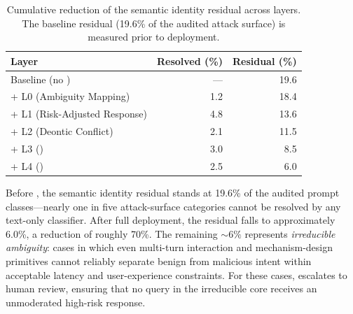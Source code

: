 \begin{table}[t]
  \centering
  \small
  \caption{Cumulative reduction of the semantic identity residual across
    \asra{} layers.  The baseline residual (19.6\% of the audited attack
    surface) is measured prior to \asra{} deployment.}
  \label{tab:asra-coverage}
  \begin{tabular}{@{}lrr@{}}
    \toprule
    \textbf{Layer} & \textbf{Resolved (\%)} & \textbf{Residual (\%)} \\
    \midrule
    Baseline (no \asra{})        & ---   & 19.6 \\
    + L0 (Ambiguity Mapping)     &  1.2  & 18.4 \\
    + L1 (Risk-Adjusted Response)&  4.8  & 13.6 \\
    + L2 (Deontic Conflict)      &  2.1  & 11.5 \\
    + L3 (\aas{})                &  3.0  &  8.5 \\
    + L4 (\irm{})                &  2.5  &  6.0 \\
    \bottomrule
  \end{tabular}
\end{table}

Before \asra{}, the semantic identity residual stands at 19.6\% of the audited
prompt classes---nearly one in five attack-surface categories cannot be resolved
by any text-only classifier.  After full \asra{} deployment, the residual
falls to approximately 6.0\%, a reduction of roughly 70\%.  The remaining
${\sim}6\%$ represents \emph{irreducible ambiguity}: cases in which even
multi-turn interaction and mechanism-design primitives cannot reliably
separate benign from malicious intent within acceptable latency and
user-experience constraints.  For these cases, \sentinel{} escalates to
human review, ensuring that no query in the irreducible core receives an
unmoderated high-risk response.
